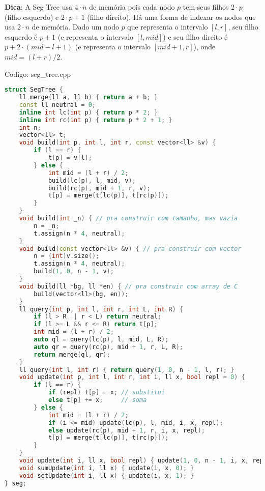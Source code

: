 \documentclass[10pt, a4paper, oneside]{book}
\begin{document}
\textbf{Dica}: A Seg Tree usa $4 \cdot n$ de memória pois cada nodo $p$ tem seus filhos $2 \cdot p$ (filho esquerdo) e $2 \cdot p + 1$ (filho direito). Há uma forma de indexar os nodos que usa $2 \cdot n$ de memória. Dado um nodo $p$ que representa o intervalo $[l, r]$, seu filho esquerdo é $p+1$ (e representa o intervalo $[l, mid]$) e seu filho direito é $p+2 \cdot (mid-l+1)$ (e representa o intervalo $[mid+1, r]$), onde $mid = (l+r)/2$.

\hfill

Codigo: seg\_tree.cpp

\begin{lstlisting}[language=C++]
struct SegTree {
    ll merge(ll a, ll b) { return a + b; }
    const ll neutral = 0;
    inline int lc(int p) { return p * 2; }
    inline int rc(int p) { return p * 2 + 1; }
    int n;
    vector<ll> t;
    void build(int p, int l, int r, const vector<ll> &v) {
        if (l == r) {
            t[p] = v[l];
        } else {
            int mid = (l + r) / 2;
            build(lc(p), l, mid, v);
            build(rc(p), mid + 1, r, v);
            t[p] = merge(t[lc(p)], t[rc(p)]);
        }
    }
    void build(int _n) { // pra construir com tamanho, mas vazia
        n = _n;
        t.assign(n * 4, neutral);
    }
    void build(const vector<ll> &v) { // pra construir com vector
        n = (int)v.size();
        t.assign(n * 4, neutral);
        build(1, 0, n - 1, v);
    }
    void build(ll *bg, ll *en) { // pra construir com array de C
        build(vector<ll>(bg, en));
    }
    ll query(int p, int l, int r, int L, int R) {
        if (l > R || r < L) return neutral;
        if (l >= L && r <= R) return t[p];
        int mid = (l + r) / 2;
        auto ql = query(lc(p), l, mid, L, R);
        auto qr = query(rc(p), mid + 1, r, L, R);
        return merge(ql, qr);
    }
    ll query(int l, int r) { return query(1, 0, n - 1, l, r); }
    void update(int p, int l, int r, int i, ll x, bool repl = 0) {
        if (l == r) {
            if (repl) t[p] = x; // substitui
            else t[p] += x;     // soma
        } else {
            int mid = (l + r) / 2;
            if (i <= mid) update(lc(p), l, mid, i, x, repl);
            else update(rc(p), mid + 1, r, i, x, repl);
            t[p] = merge(t[lc(p)], t[rc(p)]);
        }
    }
    void update(int i, ll x, bool repl) { update(1, 0, n - 1, i, x, repl); }
    void sumUpdate(int i, ll x) { update(i, x, 0); }
    void setUpdate(int i, ll x) { update(i, x, 1); }
} seg;
\end{lstlisting}
\hfill
\end{document}
